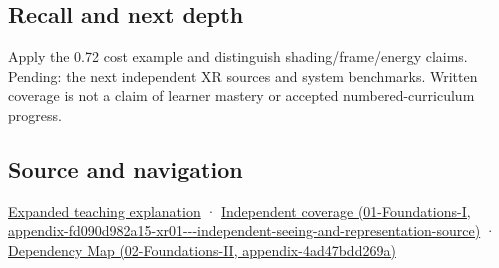 \subsection{Recall and next depth}\label{appendix-5878b813b732-recall-and-next-depth}

Apply the 0.72 cost example and distinguish shading/frame/energy claims. Pending: the next independent XR sources and system benchmarks. Written coverage is not a claim of learner mastery or accepted numbered-curriculum progress.

\subsection{Source and navigation}\label{appendix-5878b813b732-source-and-navigation}

\href{Continuous\%20Notes/University\%20-\%20Worlds,\%20Images\%20and\%20Inference\%20-\%20Graphics,\%20Vision\%20and\%20Photography\#Foveation\%20is\%20allocation\%20under\%20uncertain\%20perception\%20and\%20timing}{Expanded teaching explanation} · \href{../01-Foundations-I/main.pdf\#nameddest=appendix-fd090d982a15-xr01---independent-seeing-and-representation-source}{Independent coverage (01-Foundations-I, appendix-fd090d982a15-xr01-\/-\/-independent-seeing-and-representation-source)} · \href{../02-Foundations-II/main.pdf\#nameddest=appendix-4ad47bdd269a}{Dependency Map (02-Foundations-II, appendix-4ad47bdd269a)}
